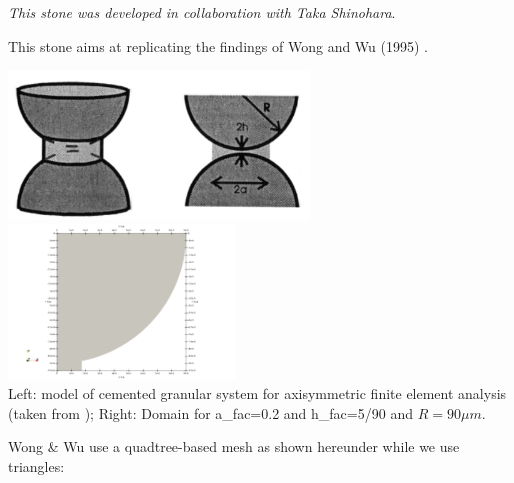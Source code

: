 

{\sl This stone was developed in collaboration with Taka Shinohara}.

This stone aims at replicating the findings of Wong and Wu (1995) \cite{wowu95}.

\begin{center}
\includegraphics[width=8cm]{python_codes/fieldstone_63/images/yoyo}
\includegraphics[width=6cm]{python_codes/fieldstone_63/images/domain}\\
{\captionfont Left: model of cemented granular system for 
axisymmetric finite element analysis (taken from \cite{wowu95}); Right: 
Domain for a\_fac=0.2 and h\_fac=5/90 and $R=90\mu m$.}
\end{center}

Wong \& Wu use a quadtree-based mesh as shown hereunder while we 
use triangles:

